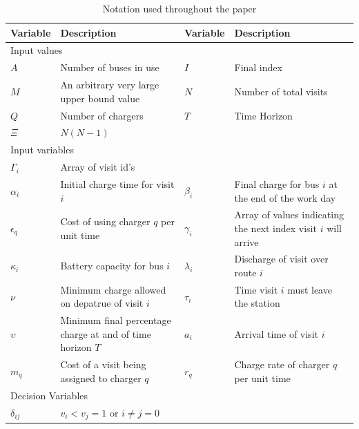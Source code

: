 \documentclass[letterpaper, 10pt, conference]{IEEEtran}
\begin{document}
\begin{table}[!t]
	\caption{Notation used throughout the paper}
	\label{tab:variables}
	\centering
	\begin{tabular}{l l l l}
		\toprule
		\textbf{Variable} & \textbf{Description} & \textbf{Variable} & \textbf{Description} \\
		\toprule
		\multicolumn{4}{l}{Input values} \\
			$A$         & Number of buses in use &
			$I$         & Final index            \\
			$M$         & An arbitrary very large upper bound value &
			$N$         & Number of total visits                    \\
			$Q$         & Number of chargers                        &
			$T$         & Time Horizon           \\
			$\Xi$       & $N(N-1)$                                   \\
		\hline
		\multicolumn{4}{l}{Input variables} \\
			$\Gamma_i$   & Array of visit id's                                             \\
			$\alpha_i$   & Initial charge time for visit  $i$                              &
			$\beta_{i}$  & Final charge for bus $i$ at the end of the work day             \\
			$\epsilon_q$ & Cost of using charger $q$ per unit time                         &
			$\gamma_i$   & Array of values indicating the next index visit $i$ will arrive \\
			$\kappa_i$   & Battery capacity for bus \(i\)                                  &
			$\lambda_i$  & Discharge of visit over route  $i$                              \\
			$\nu$        & Minimum charge allowed on depatrue of visit \(i\)               &
			$\tau_i$     & Time visit $i$ must leave the station                           \\
			$\upsilon$   & Minimum final percentage charge at and of time horizon \(T\)    &
			$a_i$        & Arrival time of visit  $i$                                      \\
			$m_q$        & Cost of a visit being assigned to charger  $q$                  &
			$r_q$        & Charge rate of charger $q$ per unit time                        \\
		\hline
		\multicolumn{4}{l}{Decision Variables} \\
			$\delta_{ij}$ & $v_i < v_j = 1$ \textrm{ or } $i \neq j = 0$                    &

\end{tabular}
\end{table}
\end{document}
